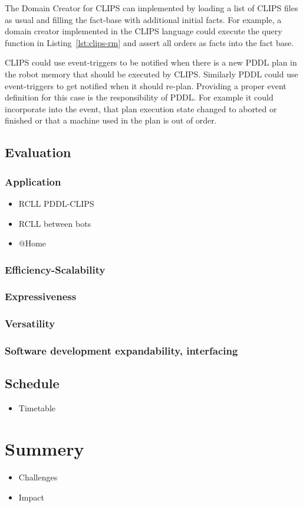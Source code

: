 \documentclass[a4paper,11pt]{article}
\newcommand{\reflst}[1]{Listing~\ref{#1}}
\begin{document}
The Domain Creator for CLIPS can implemented by loading a list of
CLIPS files as usual and filling the fact-base with additional initial
facts. For example, a domain creator implemented in the CLIPS language
could execute the query function in \reflst{lst:clips-rm} and assert
all orders as facts into the fact base.

CLIPS could use event-triggers to be notified when there is a new PDDL
plan in the robot memory that should be executed by CLIPS. Similarly
PDDL could use event-triggers to get notified when it should
re-plan. Providing a proper event definition for this case is the
responsibility of PDDL. For example it could incorporate into the
event, that plan execution state changed to aborted or finished or
that a machine used in the plan is out of order.

\subsection{Evaluation}
\label{sec:eval}
\subsubsection{Application}
\label{sec:eval-apl}
\begin{itemize}
\item RCLL PDDL-CLIPS
\item RCLL between bots
\item @Home
\end{itemize}
\subsubsection{Efficiency-Scalability}
\subsubsection{Expressiveness}
\subsubsection{Versatility}
\subsubsection{Software development expandability, interfacing}

\subsection{Schedule}
\begin{itemize}
\item Timetable
\end{itemize}

\section{Summery}
\label{sec:summery}
\begin{itemize}
\item Challenges
\item Impact
\end{itemize}




\end{document}
